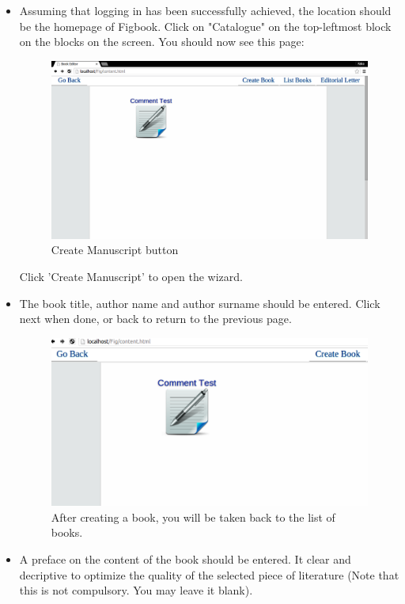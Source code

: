 	\begin{itemize}
		\item Assuming that logging in has been successfully achieved, the location should be the homepage of Figbook. Click on "Catalogue" on the top-leftmost block on the blocks on the screen. You should now see this page:
		
		\begin{figure}[h]
		\centering
			\includegraphics[scale=0.3]{images/SeePage.png}
			\caption{Create Manuscript button}
		\end{figure}
		
		Click 'Create Manuscript' to open the wizard.
		\item The book title, author name and author surname should be entered. Click next when done, or back to return to the previous page.
		
		\begin{figure}[h]
			\centering
			\includegraphics[scale=0.5]{images/SelectBook2.png}
			\caption{After creating a book, you will be taken back to the list of books.}
		\end{figure}
		\newpage
		\item A preface on the content of the book should be entered. It clear and decriptive to optimize the quality of the selected piece of literature (Note that this is not compulsory. You may leave it blank). 
		

\end{itemize}
